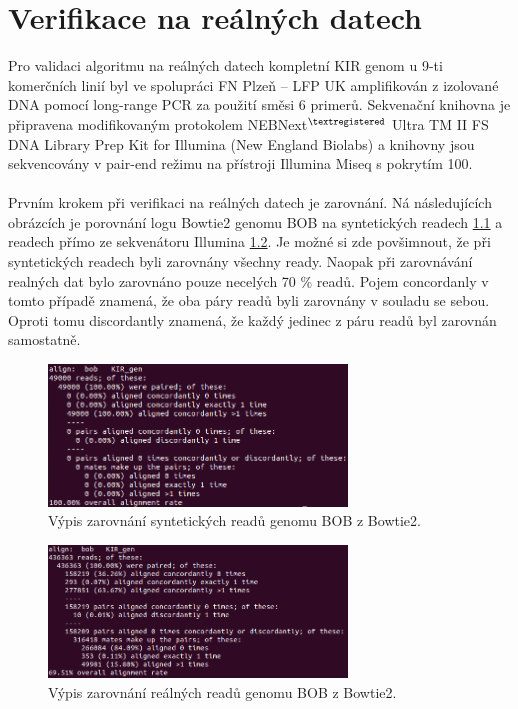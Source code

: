 \documentclass[czech,DP]{thesiskiv}
\numberwithin{equation}{section}
\begin{document}
\chapter{Verifikace na reálných datech}
Pro validaci algoritmu na reálných datech kompletní KIR genom u 9-ti komerčních linií byl ve spolupráci FN Plzeň – LFP UK amplifikován z izolované DNA pomocí long-range PCR za použití směsi 6 primerů. Sekvenační knihovna je připravena modifikovaným protokolem NEBNext$^{\textregistered}$ Ultra TM II FS DNA Library Prep Kit for Illumina (New England Biolabs) a knihovny jsou sekvencovány v pair-end režimu na přístroji Illumina Miseq s pokrytím 100. \cite{real_data}
\\
\\
Prvním krokem při verifikaci na reálných datech je zarovnání. Ná následujících obrázcích je porovnání logu Bowtie2 genomu BOB na syntetických readech \ref{fig:bob_syntetic_bowtie_align} a readech přímo ze sekvenátoru Illumina \ref{fig:bob_real_bowtie_align}. Je možné si zde povšimnout, že při syntetických readech byli zarovnány všechny ready. Naopak při zarovnávání realných dat bylo zarovnáno pouze necelých 70 \% readů. Pojem concordanly v tomto případě znamená, že oba páry readů byli zarovnány v souladu se sebou. Oproti tomu discordantly znamená, že každý jedinec z páru readů byl zarovnán samostatně.

\begin{figure}[H]		
		\centering
		\includegraphics[width=300px]{./img/bob_syntetic_bowtie_align.png}
		\caption{Výpis zarovnání syntetických readů genomu BOB z Bowtie2.}
		\label{fig:bob_syntetic_bowtie_align}
\end{figure}

\begin{figure}[H]		
		\centering
		\includegraphics[width=300px]{./img/bob_real_bowtie_align.png}
		\caption{Výpis zarovnání reálných readů genomu BOB z Bowtie2.}
		\label{fig:bob_real_bowtie_align}
\end{figure}
\end{document}
